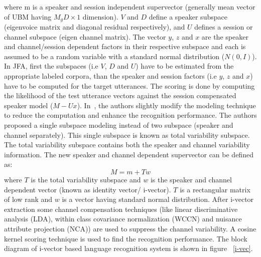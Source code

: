 \begin{spacing}{1.5}
where m is a speaker and session independent supervector (generally mean vector of UBM having $M_{g}D\times 1$ dimension). $V$ and $D$ define a speaker subspace (eigenvoice matrix and diagonal residual respectively), and $U$ defines a session or channel subspace (eigen channel matrix). The vector $y$, $z$ and $x$ are the speaker and channel/session dependent factors in their respective subspace and each is assumed to be a random variable with a standard normal distribution ($N(0,I)$). In JFA, first the subspaces (i.e $V$, $D$ and $U$) have to be estimated from the appropriate labeled corpora, than the speaker and session factors (i.e $y$, $z$ and $x$) have to be computed for the target utterances. The scoring is done by computing the likelihood of the test utterance vectors against the session compensated speaker model ($M-Ux$). In~\cite{dehak2011front}, the authors slightly modify the modeling technique to reduce the computation and enhance the recognition performance. The authors proposed a single subspace modeling instead of two subspace (speaker and channel separately). This single subspace is known as total variability subspace. The total variability subspace contains both the speaker and channel variability information. The new speaker and channel dependent supervector can be  defined as:
\begin{equation}
    \label{ivec}
    M=m+Tw
\end{equation}
where $T$ is the total variability subspace and $w$ is the speaker and channel dependent vector (known as identity vector/ i-vector). $T$ is a rectangular matrix of low rank and $w$ is a vector having standard normal distribution. After i-vector extraction some channel compensation techniques (like linear discriminative analysis (LDA), within class covariance normalization (WCCN) and nuisance attribute projection (NCA)) are used to suppress the channel variability. A cosine kernel scoring technique is used to find the recognition performance. The block diagram of i-vector based language recognition system is shown in figure ~\ref{i-vec}. 


\end{spacing}

